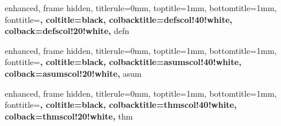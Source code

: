 {
    enhanced,
    frame hidden,
    titlerule=0mm,
    toptitle=1mm,
    bottomtitle=1mm,
    fonttitle=\bfseries\large,
    coltitle=black,
    colbacktitle=defscol!40!white,
    colback=defscol!20!white,
}{defn}



{
    enhanced,
    frame hidden,
    titlerule=0mm,
    toptitle=1mm,
    bottomtitle=1mm,
    fonttitle=\bfseries\large,
    coltitle=black,
    colbacktitle=asumscol!40!white,
    colback=asumscol!20!white,
}{asum}




{
    enhanced,
    frame hidden,
    titlerule=0mm,
    toptitle=1mm,
    bottomtitle=1mm,
    fonttitle=\bfseries\large,
    coltitle=black,
    colbacktitle=thmscol!40!white,
    colback=thmscol!20!white,
}{thm}



\newenvironment{thmpf}{
	{\noindent{\it \textbf{Доказательство:}}}
	\tcolorbox[blanker,breakable,left=5mm,parbox=false,
    before upper={\parindent15pt},
    after skip=10pt,
	borderline west={1mm}{0pt}{thmscol!40!white}]
}{
    \textcolor{thmscol!40!white}{\hbox{}\nobreak\hfill$\blacksquare$} 
    \endtcolorbox
}

